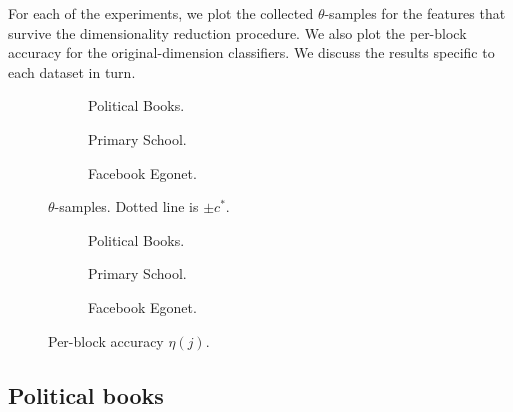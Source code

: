 For each of the experiments, we plot the collected $\theta$-samples for the features that survive the dimensionality reduction procedure. We also plot the per-block accuracy for the original-dimension classifiers. We discuss the results specific to each dataset in turn.

\begin{figure}[!h]
	\centering
	\begin{subfigure}[t]{0.32\linewidth}
			\centering
			\caption{Political Books.}
			\label{fig:polbooks-null}
		\end{subfigure}
	\begin{subfigure}[t]{0.32\linewidth}
			\centering
			\caption{Primary School.}
			\label{fig:school-null}
		\end{subfigure}
	\begin{subfigure}[t]{0.32\linewidth}
			\centering
			\caption{Facebook Egonet.}
			\label{fig:fb-null}
		\end{subfigure}
	\caption{$\theta$-samples. Dotted line is $\pm c^*$.}
\end{figure}
%
\begin{figure}[!h]
	\centering
	\begin{subfigure}[t]{0.32\linewidth}
			\centering
			\caption{Political Books.}
			\label{fig:polbooks-accuracy}
		\end{subfigure}
	\begin{subfigure}[t]{0.32\linewidth}
			\centering
			\caption{Primary School.}
			\label{fig:school-accuracy}
		\end{subfigure}
	\begin{subfigure}[t]{0.32\linewidth}
			\centering
			\caption{Facebook Egonet.}
			\label{fig:fb-accuracy}
		\end{subfigure}
	\caption{Per-block accuracy $\eta(j)$.}
\end{figure}

\subsection{Political books}

